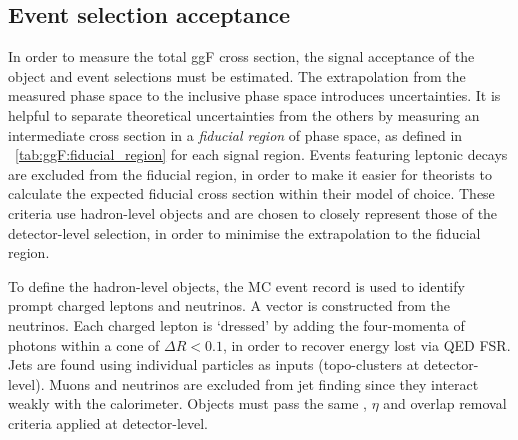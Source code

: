 \subsection{Event selection acceptance}
\label{sec:ggF:acc}

In order to measure the total ggF cross section, the signal acceptance of the object and 
event selections must be estimated. The extrapolation from the measured phase 
space to the inclusive phase space introduces uncertainties. It is helpful to 
separate theoretical uncertainties from the others by measuring an intermediate cross 
section in a \textit{fiducial region} of phase space, as defined in 
\Table~\ref{tab:ggF:fiducial_region} for each signal region. Events featuring leptonic \Ptau 
decays are excluded from the fiducial region, in order to make it easier for theorists to 
calculate the expected fiducial cross section within their model of choice. These criteria 
use hadron-level objects and are chosen to closely represent those of the detector-level 
selection, in order to minimise the extrapolation to the fiducial region.

To define the hadron-level objects, the MC event record is used to identify prompt charged 
leptons and neutrinos. A \truthmetvec vector is constructed from the neutrinos. Each charged 
lepton is `dressed' by adding the four-momenta of photons within a cone of 
$\Delta R < 0.1$, in order to recover energy lost via QED FSR. Jets are found using 
individual particles as inputs (\cf topo-clusters at detector-level). Muons and neutrinos 
are excluded from jet finding since they interact weakly with the calorimeter. Objects 
must pass the same \pt, $\eta$ and overlap removal criteria applied at detector-level.

